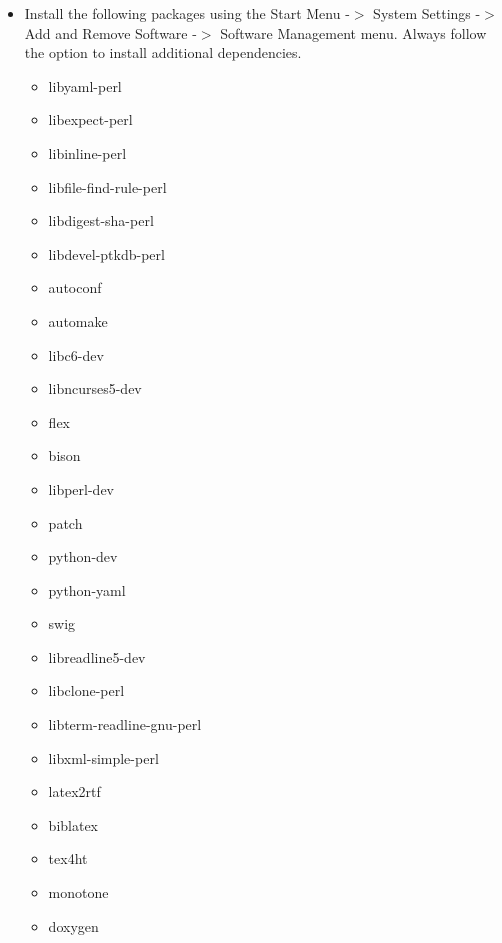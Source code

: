 \documentclass[12pt]{article}
\begin{document}
\begin{itemize}
\item[] Install the following packages using the Start Menu -$>$
  System Settings -$>$ Add and Remove Software -$>$ Software
  Management menu.  Always follow the option to install additional
  dependencies.
      \begin{itemize}
         \item libyaml-perl
         \item libexpect-perl
         \item libinline-perl
         \item libfile-find-rule-perl
         \item libdigest-sha-perl
         \item libdevel-ptkdb-perl
         \item autoconf
         \item automake
         \item libc6-dev
         \item libncurses5-dev
         \item flex
         \item bison
         \item libperl-dev
         \item patch
         \item python-dev
         \item python-yaml
         \item swig
         \item libreadline5-dev
         \item libclone-perl
         \item libterm-readline-gnu-perl
         \item libxml-simple-perl
         \item latex2rtf
         \item biblatex
         \item tex4ht
         \item monotone
         \item doxygen
      \end{itemize}
 \end{itemize}
\end{document}
